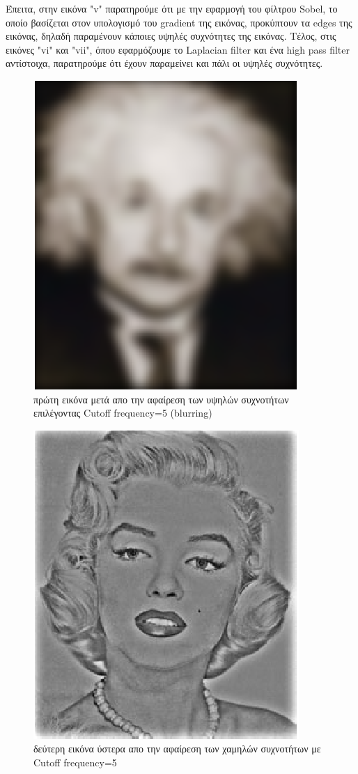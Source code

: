 \documentclass{article}
\newcommand{\tl}[1]{\textlatin{#1}}
\begin{document}
	\noindent
	Έπειτα, στην εικόνα \tl{"v"} παρατηρούμε ότι με την εφαρμογή του φίλτρου \tl{Sobel}, το οποίο βασίζεται στον υπολογισμό του \tl{gradient} της εικόνας, προκύπτουν τα \tl{edges} της εικόνας, δηλαδή παραμένουν κάποιες υψηλές συχνότητες της εικόνας. Tέλος, στις εικόνες \tl{"vi"} και \tl{"vii"}, όπου εφαρμόζουμε το \tl{Laplacian filter} και ένα \tl{high pass filter} αντίστοιχα, παρατηρούμε ότι έχουν παραμείνει και πάλι οι υψηλές συχνότητες.
	  
	\pagebreak
	\begin{figure}[H]
		\centering
		\includegraphics[scale=1]{./res/fig_1_1.eps}
		\caption{πρώτη εικόνα μετά απο την αφαίρεση των υψηλών συχνοτήτων επιλέγοντας \tl{Cutoff frequency}=5 (\tl{blurring})}
	\end{figure}
	
	\begin{figure}[H]
		\centering
		\includegraphics[scale=1]{./res/fig_1_2.eps}
		\caption{δεύτερη εικόνα ύστερα απο την αφαίρεση των χαμηλών συχνοτήτων με \tl{Cutoff frequency}=5}
	\end{figure}
	
\end{document}
